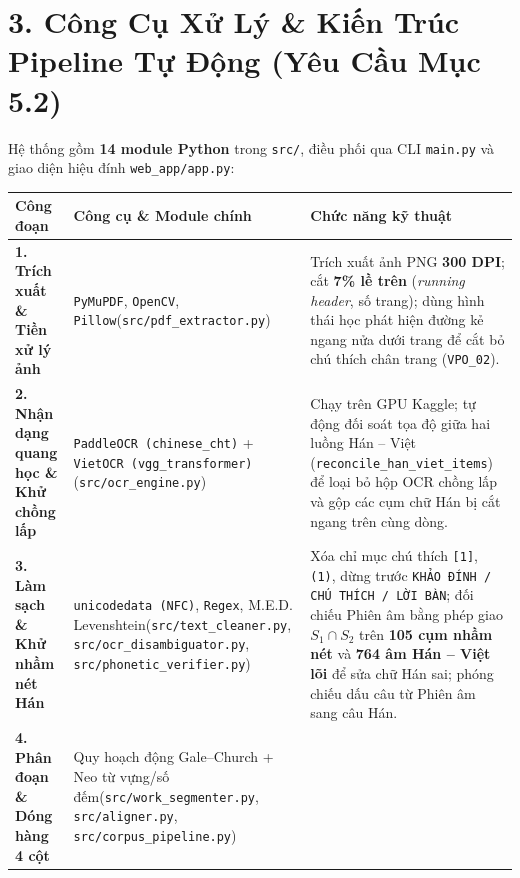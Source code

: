 \documentclass[11pt,a4paper]{article}
\begin{document}
\section{3. Công Cụ Xử Lý \& Kiến Trúc Pipeline Tự Động (Yêu Cầu Mục 5.2)}

Hệ thống gồm \textbf{14 module Python} trong \texttt{src/}, điều phối qua CLI \texttt{main.py} và giao diện hiệu đính \texttt{web\_app/app.py}:

\vspace{0.15em}
\begin{table}[h!]
\centering
\small
\begin{tabular}{L{3.1cm} L{4.2cm} L{7.8cm}}
\toprule
\textbf{Công đoạn} & \textbf{Công cụ \& Module chính} & \textbf{Chức năng kỹ thuật} \\
\midrule
\textbf{1. Trích xuất \& Tiền xử lý ảnh} &
\texttt{PyMuPDF}, \texttt{OpenCV}, \texttt{Pillow}\newline (\texttt{src/pdf\_extractor.py}) &
Trích xuất ảnh PNG \textbf{300 DPI}; cắt \textbf{7\% lề trên} (\textit{running header}, số trang); dùng hình thái học phát hiện đường kẻ ngang nửa dưới trang để cắt bỏ chú thích chân trang (\texttt{VPO\_02}). \\
\addlinespace[0.25em]
\textbf{2. Nhận dạng quang học \& Khử chồng lấp} &
\texttt{PaddleOCR (chinese\_cht)} + \texttt{VietOCR (vgg\_transformer)}\newline (\texttt{src/ocr\_engine.py}) &
Chạy trên GPU Kaggle; tự động đối soát tọa độ giữa hai luồng Hán -- Việt (\texttt{reconcile\_han\_viet\_items}) để loại bỏ hộp OCR chồng lấp và gộp các cụm chữ Hán bị cắt ngang trên cùng dòng. \\
\addlinespace[0.25em]
\textbf{3. Làm sạch \& Khử nhầm nét Hán} &
\texttt{unicodedata (NFC)}, \texttt{Regex}, M.E.D. Levenshtein\newline (\texttt{src/text\_cleaner.py}, \texttt{src/ocr\_disambiguator.py}, \texttt{src/phonetic\_verifier.py}) &
Xóa chỉ mục chú thích \texttt{[1]}, \texttt{(1)}, dừng trước \texttt{KHẢO ĐÍNH / CHÚ THÍCH / LỜI BÀN}; đối chiếu Phiên âm bằng phép giao $S_1 \cap S_2$ trên \textbf{105 cụm nhầm nét} và \textbf{764 âm Hán -- Việt lõi} để sửa chữ Hán sai; phóng chiếu dấu câu từ Phiên âm sang câu Hán. \\
\addlinespace[0.25em]
\textbf{4. Phân đoạn \& Dóng hàng 4 cột} &
Quy hoạch động Gale--Church + Neo từ vựng/số đếm\newline (\texttt{src/work\_segmenter.py}, \texttt{src/aligner.py}, \texttt{src/corpus\_pipeline.py}) &

\end{tabular}
\end{table}
\end{document}
